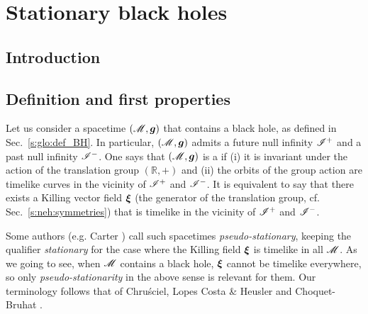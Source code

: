 \chapter{Stationary black holes}
\label{s:sta}

\minitoc

\section{Introduction}

\section{Definition and first properties} \label{s:sta:def_station}

Let us consider a spacetime $(\mathscr{M},\bm{g})$ that contains a black hole, as defined in
Sec.~\ref{s:glo:def_BH}. In particular, $(\mathscr{M},\bm{g})$ admits a future null
infinity $\mathscr{I}^+$ and a past null infinity $\mathscr{I}^-$. One says that
$(\mathscr{M},\bm{g})$ is a 
if (i) it is invariant under
the action of the translation group $(\mathbb{R},+)$ and (ii) the orbits of
the group action are timelike curves in the vicinity of $\mathscr{I}^+$ and
$\mathscr{I}^-$. It is equivalent to say that there exists a Killing vector field
$\bm{\xi}$ (the generator of the translation group, cf. Sec.~\ref{s:neh:symmetries}) that is timelike in the vicinity of $\mathscr{I}^+$ and $\mathscr{I}^-$.

\begin{remark}
Some authors (e.g. Carter \cite{Carte73b}) call such spacetimes
\emph{pseudo-stationary}, keeping the qualifier
\emph{stationary} for the case where the Killing field $\bm{\xi}$ is timelike
in all $\mathscr{M}$. As we going to see, when $\mathscr{M}$
contains a black hole, $\bm{\xi}$ cannot be timelike everywhere,
so only \emph{pseudo-stationarity} in the above sense is relevant for them.
Our terminology follows that of Chru\'sciel, Lopes Costa \& Heusler \cite{ChrusLH12}
and Choquet-Bruhat \cite{Choqu09}.
\end{remark}


